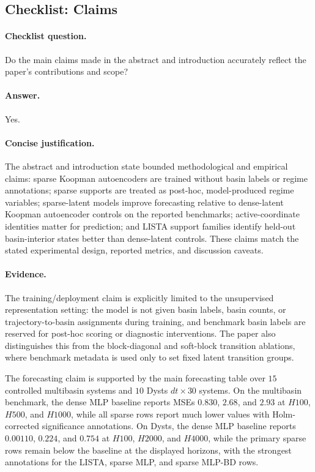 \subsection{Checklist: Claims}
\label{app:checklist_claims}

\paragraph{Checklist question.}
Do the main claims made in the abstract and introduction accurately reflect the paper's contributions and scope?

\paragraph{Answer.}
Yes.

\paragraph{Concise justification.}
The abstract and introduction state bounded methodological and empirical claims: sparse Koopman autoencoders are trained without basin labels or regime annotations; sparse supports are treated as post-hoc, model-produced regime variables; sparse-latent models improve forecasting relative to dense-latent Koopman autoencoder controls on the reported benchmarks; active-coordinate identities matter for prediction; and LISTA support families identify held-out basin-interior states better than dense-latent controls. These claims match the stated experimental design, reported metrics, and discussion caveats.

\paragraph{Evidence.}
The training/deployment claim is explicitly limited to the unsupervised representation setting: the model is not given basin labels, basin counts, or trajectory-to-basin assignments during training, and benchmark basin labels are reserved for post-hoc scoring or diagnostic interventions. The paper also distinguishes this from the block-diagonal and soft-block transition ablations, where benchmark metadata is used only to set fixed latent transition groups.

The forecasting claim is supported by the main forecasting table over \(15\) controlled multibasin systems and \(10\) Dysts \(dt{\times}30\) systems. On the multibasin benchmark, the dense MLP baseline reports MSEs \(0.830\), \(2.68\), and \(2.93\) at \(H100\), \(H500\), and \(H1000\), while all sparse rows report much lower values with Holm-corrected significance annotations. On Dysts, the dense MLP baseline reports \(0.00110\), \(0.224\), and \(0.754\) at \(H100\), \(H2000\), and \(H4000\), while the primary sparse rows remain below the baseline at the displayed horizons, with the strongest annotations for the LISTA, sparse MLP, and sparse MLP-BD rows.

